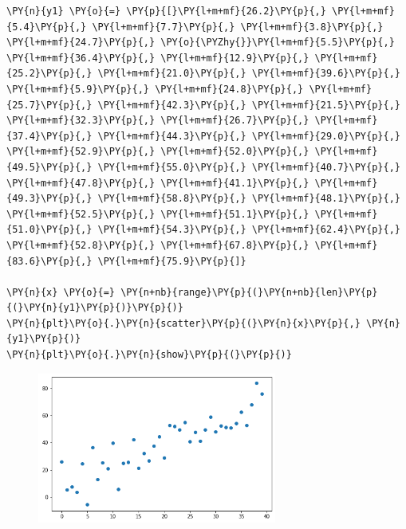 \begin{tcolorbox}[breakable, size=fbox, boxrule=1pt, pad at break*=1mm,colback=cellbackground, colframe=cellborder]
\begin{Verbatim}[commandchars=\\\{\}]
\PY{n}{y1} \PY{o}{=} \PY{p}{[}\PY{l+m+mf}{26.2}\PY{p}{,} \PY{l+m+mf}{5.4}\PY{p}{,} \PY{l+m+mf}{7.7}\PY{p}{,} \PY{l+m+mf}{3.8}\PY{p}{,} \PY{l+m+mf}{24.7}\PY{p}{,} \PY{o}{\PYZhy{}}\PY{l+m+mf}{5.5}\PY{p}{,} \PY{l+m+mf}{36.4}\PY{p}{,} \PY{l+m+mf}{12.9}\PY{p}{,} \PY{l+m+mf}{25.2}\PY{p}{,} \PY{l+m+mf}{21.0}\PY{p}{,} \PY{l+m+mf}{39.6}\PY{p}{,} 
\PY{l+m+mf}{5.9}\PY{p}{,} \PY{l+m+mf}{24.8}\PY{p}{,} \PY{l+m+mf}{25.7}\PY{p}{,} \PY{l+m+mf}{42.3}\PY{p}{,} \PY{l+m+mf}{21.5}\PY{p}{,} \PY{l+m+mf}{32.3}\PY{p}{,} \PY{l+m+mf}{26.7}\PY{p}{,} \PY{l+m+mf}{37.4}\PY{p}{,} \PY{l+m+mf}{44.3}\PY{p}{,} \PY{l+m+mf}{29.0}\PY{p}{,} 
\PY{l+m+mf}{52.9}\PY{p}{,} \PY{l+m+mf}{52.0}\PY{p}{,} \PY{l+m+mf}{49.5}\PY{p}{,} \PY{l+m+mf}{55.0}\PY{p}{,} \PY{l+m+mf}{40.7}\PY{p}{,} \PY{l+m+mf}{47.8}\PY{p}{,} \PY{l+m+mf}{41.1}\PY{p}{,} \PY{l+m+mf}{49.3}\PY{p}{,} \PY{l+m+mf}{58.8}\PY{p}{,} \PY{l+m+mf}{48.1}\PY{p}{,} 
\PY{l+m+mf}{52.5}\PY{p}{,} \PY{l+m+mf}{51.1}\PY{p}{,} \PY{l+m+mf}{51.0}\PY{p}{,} \PY{l+m+mf}{54.3}\PY{p}{,} \PY{l+m+mf}{62.4}\PY{p}{,} \PY{l+m+mf}{52.8}\PY{p}{,} \PY{l+m+mf}{67.8}\PY{p}{,} \PY{l+m+mf}{83.6}\PY{p}{,} \PY{l+m+mf}{75.9}\PY{p}{]}
	
\PY{n}{x} \PY{o}{=} \PY{n+nb}{range}\PY{p}{(}\PY{n+nb}{len}\PY{p}{(}\PY{n}{y1}\PY{p}{)}\PY{p}{)}
\PY{n}{plt}\PY{o}{.}\PY{n}{scatter}\PY{p}{(}\PY{n}{x}\PY{p}{,} \PY{n}{y1}\PY{p}{)}
\PY{n}{plt}\PY{o}{.}\PY{n}{show}\PY{p}{(}\PY{p}{)}
\end{Verbatim}
\end{tcolorbox}

\begin{figure}[h]
	\centering
	\includegraphics[width=0.7\textwidth]{figures/matplotlib_9_0.png}
\end{figure}


